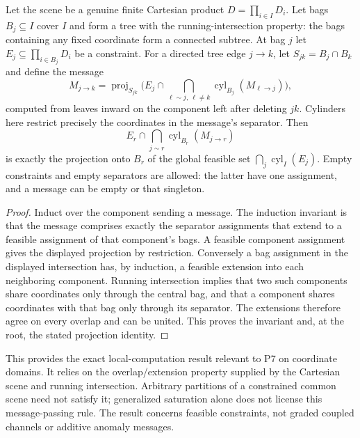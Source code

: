 \begin{thmplain}

Let the scene be a genuine finite Cartesian product \(D=\prod_{i\in I}D_i\). Let bags \(B_j\subseteq I\) cover \(I\) and form a tree with the running-intersection property: the bags containing any fixed coordinate form a connected subtree. At bag \(j\) let \(E_j\subseteq\prod_{i\in B_j}D_i\) be a constraint. For a directed tree edge \(j\to k\), let \(S_{jk}=B_j\cap B_k\) and define the message
\[
M_{j\to k}=\operatorname{proj}_{S_{jk}}\Big(E_j\cap\bigcap_{\ell\sim j,\ \ell\ne k}\operatorname{cyl}_{B_j}(M_{\ell\to j})\Big),
\]
computed from leaves inward on the component left after deleting \(jk\). Cylinders here restrict precisely the coordinates in the message's separator. Then
\[
E_r\cap\bigcap_{j\sim r}\operatorname{cyl}_{B_r}(M_{j\to r})
\]
is exactly the projection onto \(B_r\) of the global feasible set \(\bigcap_j\operatorname{cyl}_{I}(E_j)\). Empty constraints and empty separators are allowed: the latter have one assignment, and a message can be empty or that singleton.
\end{thmplain}

\begin{proof}

Induct over the component sending a message. The induction invariant is that the message comprises exactly the separator assignments that extend to a feasible assignment of that component's bags. A feasible component assignment gives the displayed projection by restriction. Conversely a bag assignment in the displayed intersection has, by induction, a feasible extension into each neighboring component. Running intersection implies that two such components share coordinates only through the central bag, and that a component shares coordinates with that bag only through its separator. The extensions therefore agree on every overlap and can be united. This proves the invariant and, at the root, the stated projection identity.
\end{proof}

This provides the exact local-computation result relevant to P7 on coordinate domains. It relies on the overlap/extension property supplied by the Cartesian scene and running intersection. Arbitrary partitions of a constrained common scene need not satisfy it; generalized saturation alone does not license this message-passing rule. The result concerns feasible constraints, not graded coupled channels or additive anomaly messages.

